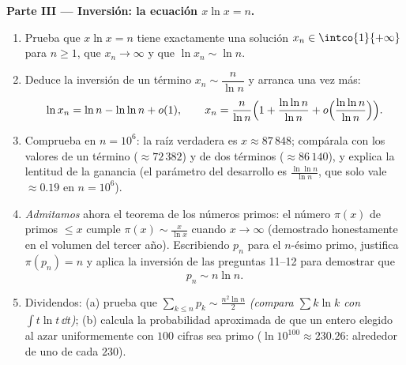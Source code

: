 \begin{problem}
\medskip
\noindent\textbf{Parte III --- Inversión: la ecuación $x\ln x =
n$.}
\begin{enumerate}[resume]
  \item Prueba que $x\ln x = n$ tiene exactamente una solución $x_n
        \in \intco{1}{+\infty}$ para $n \geq 1$, que $x_n \to
        \infty$ y que $\ln x_n \sim \ln n$.
  \item Deduce la inversión de un término $x_n \sim
        \dfrac{n}{\ln n}$ y arranca una vez más:
        \[
        \ln x_n = \ln n - \ln\ln n + o(1),
        \qquad
        x_n = \frac{n}{\ln n}\Bigl(1 + \frac{\ln\ln n}{\ln n}
        + o\Bigl(\frac{\ln\ln n}{\ln n}\Bigr)\Bigr).
        \]
  \item Comprueba en $n = 10^6$: la raíz verdadera es $x \approx
        87\,848$; compárala con los valores de un término ($\approx
        72\,382$) y de dos términos ($\approx 86\,140$), y explica
        la lentitud de la ganancia (el parámetro del desarrollo es
        $\frac{\ln\ln n}{\ln n}$, que solo vale $\approx 0.19$ en $n
        = 10^6$).
  \item \emph{Admitamos} ahora el teorema de los números primos: el
        número $\pi(x)$ de primos $\leq x$ cumple $\pi(x) \sim
        \frac{x}{\ln x}$ cuando $x \to \infty$ (demostrado
        honestamente en el volumen del tercer año). Escribiendo
        $p_n$ para el $n$-ésimo primo, justifica $\pi(p_n) = n$ y
        aplica la inversión de las preguntas 11--12 para demostrar
        que
        \[
        p_n \sim n \ln n .
        \]
  \item Dividendos: (a) prueba que $\sum_{k \leq n} p_k \sim
        \frac{n^2\ln n}{2}$ \emph{(compara $\sum k\ln k$ con $\int
        t\ln t\,\dd t$)}; (b) calcula la probabilidad aproximada de
        que un entero elegido al azar uniformemente con $100$ cifras
        sea primo ($\ln 10^{100} \approx 230.26$: alrededor de uno
        de cada $230$).
\end{enumerate}


\end{problem}
